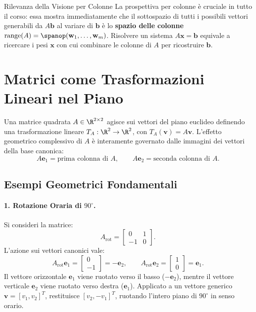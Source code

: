 \begin{noteblock}{Rilevanza della Visione per Colonne}
La prospettiva per colonne è cruciale in tutto il corso: essa mostra immediatamente che il sottospazio di tutti i possibili vettori generabili da $A \mathbf{b}$ al variare di $\mathbf{b}$ è lo \textbf{spazio delle colonne} $\mathrm{range}(A) = \spanop(\mathbf{w}_1, \dots, \mathbf{w}_m)$. Risolvere un sistema $A \mathbf{x} = \mathbf{b}$ equivale a ricercare i pesi $\mathbf{x}$ con cui combinare le colonne di $A$ per ricostruire $\mathbf{b}$.
\end{noteblock}

\FloatBarrier
\section{Matrici come Trasformazioni Lineari nel Piano}

Una matrice quadrata $A \in \R^{2 \times 2}$ agisce sui vettori del piano euclideo definendo una trasformazione lineare $T_A: \R^2 \to \R^2$, con $T_A(\mathbf{v}) = A \mathbf{v}$. L'effetto geometrico complessivo di $A$ è interamente governato dalle immagini dei vettori della base canonica:
\begin{equation}
    A \mathbf{e}_1 = \text{prima colonna di } A, \qquad A \mathbf{e}_2 = \text{seconda colonna di } A.
\end{equation}

\subsection{Esempi Geometrici Fondamentali}

\paragraph{1. Rotazione Oraria di $90^\circ$.}
Si consideri la matrice:
\begin{equation}
    A_{\text{rot}} = \begin{bmatrix} 0 & 1 \\ -1 & 0 \end{bmatrix}.
\end{equation}
L'azione sui vettori canonici vale:
\begin{equation}
    A_{\text{rot}} \mathbf{e}_1 = \begin{bmatrix} 0 \\ -1 \end{bmatrix} = -\mathbf{e}_2, \qquad A_{\text{rot}} \mathbf{e}_2 = \begin{bmatrix} 1 \\ 0 \end{bmatrix} = \mathbf{e}_1.
\end{equation}
Il vettore orizzontale $\mathbf{e}_1$ viene ruotato verso il basso ($-\mathbf{e}_2$), mentre il vettore verticale $\mathbf{e}_2$ viene ruotato verso destra ($\mathbf{e}_1$). Applicato a un vettore generico $\mathbf{v} = [v_1, v_2]^T$, restituisce $[v_2, -v_1]^T$, ruotando l'intero piano di $90^\circ$ in senso orario.

